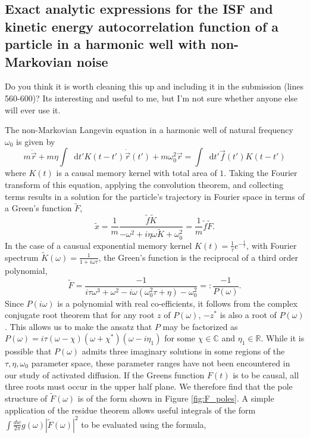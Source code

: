 \documentclass[7pt]{article}
\newcommand*{\diff}{\mathop{}\!\mathrm{d}}
\begin{document}
\subsection*{Exact analytic expressions for the ISF and kinetic energy autocorrelation function of a particle in a harmonic well with non-Markovian noise}

Do you think it is worth cleaning this up and including it in the submission (lines 560-600)? Its interesting and useful to me, but I'm not sure whether anyone else will ever use it.

The non-Markovian Langevin equation in a harmonic well of natural frequency $\omega_0$ is given by
$$
m\ddot{\vec{r}}+m\eta\int\diff{t'}K(t-t')\dot{\vec{r}}(t')+m\omega_0^2\vec{r}=\int\diff{t'}\vec{f}(t')K(t-t')
$$
where $K(t)$ is a causal memory kernel with total area of $1$. Taking the Fourier transform of this equation, applying the convolution theorem, and collecting terms results in a solution for the particle's trajectory in Fourier space in terms of a Green's function $\tilde{F}$,
$$
\tilde{x} = \frac{1}{m} \frac{\tilde{f} \tilde{K}}{-\omega^2 + i \eta \omega \tilde{K} + \omega_0^2} = \frac{1}{m} \tilde{f} \tilde{F}. \label{eq:greens_function}
$$
In the case of a causual exponential memory kernel $K(t)=\frac{1}{\tau}e^{-\frac{t}{\tau}}$, with Fourier spectrum $\tilde{K}(\omega)=\frac{1}{1+i\omega\tau}$, the Green's function is the reciprocal of a third order polynomial,
$$
\tilde{F} = \frac{-1}{i\tau\omega^3 + \omega^2 - i\omega(\omega_0^2\tau + \eta) - \omega_0^2} =: \frac{-1}{P(\omega)}.
$$
Since $P(i\omega)$ is a polynomial with real co-efficients, it follows from the complex conjugate root theorem that for any root $z$ of $P(\omega)$, $-z^*$ is also a root of $P(\omega)$. This allows us to make the ansatz that $P$ may be factorized as $P(\omega) = i\tau\left(\omega - \chi\right)\left(\omega + \chi^*\right)\left(\omega - i\eta_1\right)$ for some $\chi\in\mathbb{C}$ and ${\eta_1\in\mathbb{R}}$. While it is possible that $P(\omega)$ admits three imaginary solutions in some regions of the $\tau,\eta,\omega_0$ parameter space, these parameter ranges have not been encountered in our study of activated diffusion. If the Greens function $F(t)$ is to be causal, all three roots must occur in the upper half plane. We therefore find that the pole structure of $\tilde{F}(\omega)$ is of the form shown in Figure \ref{fig:F_poles}. A simple application of the residue theorem allows useful integrals of the form $\int\frac{dw}{2\pi} g\left(\omega\right) \left|\tilde{F}\left(\omega\right)\right|^2$ to be evaluated using the formula,
\end{document}
